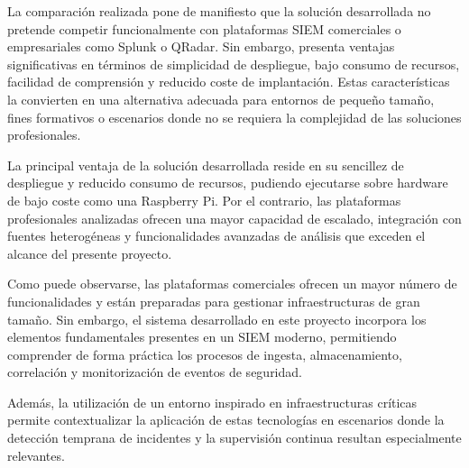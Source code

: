 La comparación realizada pone de manifiesto que la solución desarrollada no pretende competir funcionalmente con plataformas SIEM comerciales o empresariales como Splunk o QRadar. Sin embargo, presenta ventajas significativas en términos de simplicidad de despliegue, bajo consumo de recursos, facilidad de comprensión y reducido coste de implantación. Estas características la convierten en una alternativa adecuada para entornos de pequeño tamaño, fines formativos o escenarios donde no se requiera la complejidad de las soluciones profesionales.

La principal ventaja de la solución desarrollada reside en su sencillez de despliegue y reducido consumo de recursos, pudiendo ejecutarse sobre hardware de bajo coste como una Raspberry Pi. Por el contrario, las plataformas profesionales analizadas ofrecen una mayor capacidad de escalado, integración con fuentes heterogéneas y funcionalidades avanzadas de análisis que exceden el alcance del presente proyecto.

Como puede observarse, las plataformas comerciales ofrecen un mayor número de funcionalidades y están preparadas para gestionar infraestructuras de gran tamaño. Sin embargo, el sistema desarrollado en este proyecto incorpora los elementos fundamentales presentes en un SIEM moderno, permitiendo comprender de forma práctica los procesos de ingesta, almacenamiento, correlación y monitorización de eventos de seguridad.

Además, la utilización de un entorno inspirado en infraestructuras críticas permite contextualizar la aplicación de estas tecnologías en escenarios donde la detección temprana de incidentes y la supervisión continua resultan especialmente relevantes.


